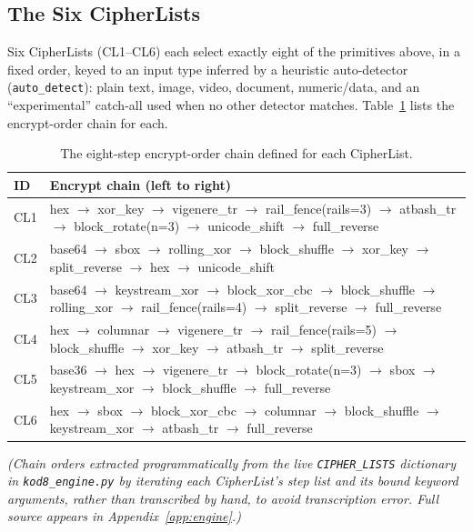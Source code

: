 \documentclass[11pt]{article}
\begin{document}
\subsection{The Six CipherLists}

Six CipherLists (CL1–CL6) each select exactly eight of the primitives
above, in a fixed order, keyed to an input type inferred by a heuristic
auto-detector (\texttt{auto\_detect}): plain text, image, video,
document, numeric/data, and an ``experimental'' catch-all used when no
other detector matches. Table~\ref{tab:chains} lists the encrypt-order
chain for each.

\begin{table}[h]
\centering
\small
\caption{The eight-step encrypt-order chain defined for each CipherList.}
\label{tab:chains}
\begin{tabular}{@{}lp{10.5cm}@{}}
\toprule
\textbf{ID} & \textbf{Encrypt chain (left to right)} \\
\midrule
CL1 & hex $\to$ xor\_key $\to$ vigenere\_tr $\to$ rail\_fence(rails=3) $\to$ atbash\_tr $\to$ block\_rotate(n=3) $\to$ unicode\_shift $\to$ full\_reverse \\
CL2 & base64 $\to$ sbox $\to$ rolling\_xor $\to$ block\_shuffle $\to$ xor\_key $\to$ split\_reverse $\to$ hex $\to$ unicode\_shift \\
CL3 & base64 $\to$ keystream\_xor $\to$ block\_xor\_cbc $\to$ block\_shuffle $\to$ rolling\_xor $\to$ rail\_fence(rails=4) $\to$ split\_reverse $\to$ full\_reverse \\
CL4 & hex $\to$ columnar $\to$ vigenere\_tr $\to$ rail\_fence(rails=5) $\to$ block\_shuffle $\to$ xor\_key $\to$ atbash\_tr $\to$ split\_reverse \\
CL5 & base36 $\to$ hex $\to$ vigenere\_tr $\to$ block\_rotate(n=3) $\to$ sbox $\to$ keystream\_xor $\to$ block\_shuffle $\to$ full\_reverse \\
CL6 & hex $\to$ sbox $\to$ block\_xor\_cbc $\to$ columnar $\to$ block\_shuffle $\to$ keystream\_xor $\to$ atbash\_tr $\to$ full\_reverse \\
\bottomrule
\end{tabular}
\end{table}

\noindent
\emph{(Chain orders extracted programmatically from the live
\texttt{CIPHER\_LISTS} dictionary in \texttt{kod8\_engine.py} by
iterating each CipherList's step list and its bound keyword arguments,
rather than transcribed by hand, to avoid transcription error. Full
source appears in Appendix~\ref{app:engine}.)}
\end{document}
